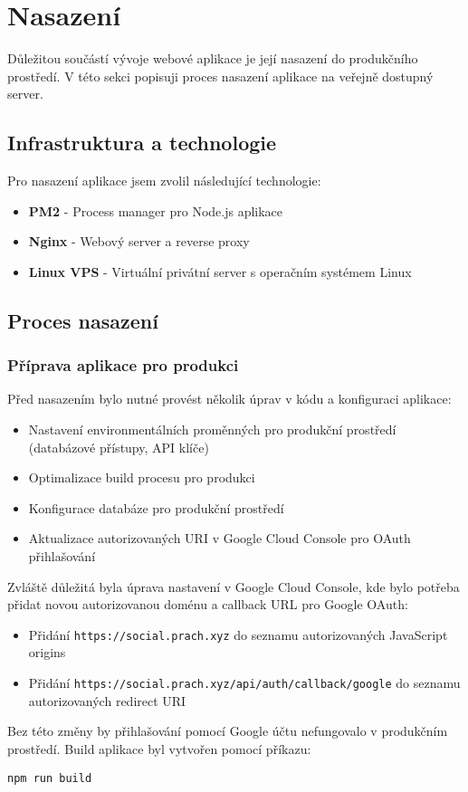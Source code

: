 \documentclass[12pt]{article}
\begin{document}
\newpage
\section{Nasazení}
Důležitou součástí vývoje webové aplikace je její nasazení do produkčního prostředí. V této sekci popisuji proces nasazení aplikace na veřejně dostupný server.
\subsection{Infrastruktura a technologie}
Pro nasazení aplikace jsem zvolil následující technologie:
\begin{itemize}
\item \textbf{PM2} - Process manager pro Node.js aplikace
\item \textbf{Nginx} - Webový server a reverse proxy
\item \textbf{Linux VPS} - Virtuální privátní server s operačním systémem Linux
\end{itemize}
\subsection{Proces nasazení}
\subsubsection{Příprava aplikace pro produkci}
Před nasazením bylo nutné provést několik úprav v kódu a konfiguraci aplikace:
\begin{itemize}
\item Nastavení environmentálních proměnných pro produkční prostředí (databázové přístupy, API klíče)
\item Optimalizace build procesu pro produkci
\item Konfigurace databáze pro produkční prostředí
\item Aktualizace autorizovaných URI v Google Cloud Console pro OAuth přihlašování
\end{itemize}
Zvláště důležitá byla úprava nastavení v Google Cloud Console, kde bylo potřeba přidat novou autorizovanou doménu a callback URL pro Google OAuth:
\begin{itemize}
\item Přidání \texttt{https://social.prach.xyz} do seznamu autorizovaných JavaScript origins
\item Přidání \texttt{https://social.prach.xyz/api/auth/callback/google} do seznamu autorizovaných redirect URI
\end{itemize}
Bez této změny by přihlašování pomocí Google účtu nefungovalo v produkčním prostředí.
Build aplikace byl vytvořen pomocí příkazu:
\begin{verbatim}
npm run build
\end{verbatim}
\end{document}
